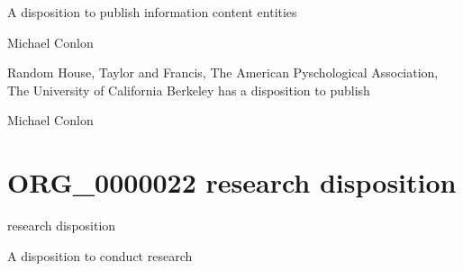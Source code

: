 \documentclass[letterpaper,10pt,english]{sphinxmanual}
\begin{document}
\begin{sphinxShadowBox}

\sphinxAtStartPar
A disposition to publish information content entities
\end{sphinxShadowBox}

\begin{sphinxShadowBox}

\sphinxAtStartPar
Michael Conlon 
\end{sphinxShadowBox}

\begin{sphinxShadowBox}

\sphinxAtStartPar
Random House, Taylor and Francis, The American Pyschological Association, The University of California Berkeley has a disposition to publish
\end{sphinxShadowBox}

\begin{sphinxShadowBox}

\sphinxAtStartPar
Michael Conlon 
\end{sphinxShadowBox}
\begin{quote}
\label{\detokenize{doc-ORG_0000022:org-0000022}}\label{\detokenize{doc-ORG_0000022:research-disposition}}\label{\detokenize{doc-ORG_0000022:org-0000022}}
\ignorespaces \end{quote}


\section{ORG\_0000022 \sphinxhyphen{} research disposition}
\label{\detokenize{doc-ORG_0000022:org-0000022-research-disposition}}\label{\detokenize{doc-ORG_0000022:index-0}}\label{\detokenize{doc-ORG_0000022::doc}}
\begin{sphinxShadowBox}

\sphinxAtStartPar
research disposition
\end{sphinxShadowBox}

\begin{sphinxShadowBox}

\sphinxAtStartPar
A disposition to conduct research
\end{sphinxShadowBox}
\end{document}
